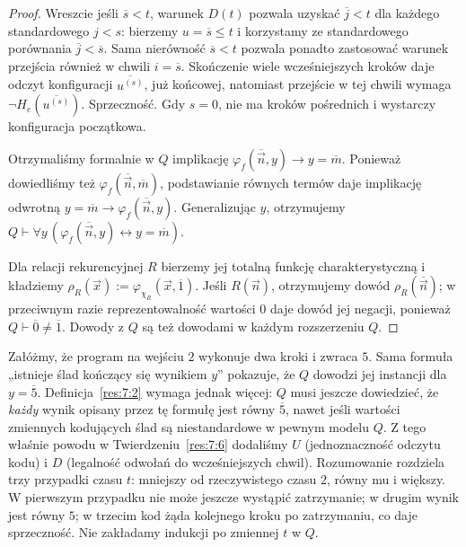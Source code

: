 \begin{proof}
Wreszcie jeśli $\overline s<t$, warunek $D(t)$ pozwala
uzyskać $\overline j<t$ dla każdego standardowego $j<s$:
bierzemy $u=\overline s\le t$ i korzystamy ze standardowego
porównania $\overline j<\overline s$. Sama nierówność
$\overline s<t$ pozwala ponadto zastosować warunek
przejścia również w chwili $i=\overline s$. Skończenie
wiele wcześniejszych kroków daje odczyt konfiguracji
$\overline{u^{(s)}}$, już końcowej, natomiast przejście w tej chwili
wymaga $\neg H_e(\overline{u^{(s)}})$. Sprzeczność. Gdy $s=0$,
nie ma kroków pośrednich i wystarczy konfiguracja początkowa.

Otrzymaliśmy formalnie w $Q$ implikację
$\varphi_f(\overline{\vec n},y)\to y=\overline m$.
Ponieważ dowiedliśmy też $\varphi_f(\overline{\vec n},\overline m)$,
podstawianie równych termów daje implikację odwrotną
$y=\overline m\to\varphi_f(\overline{\vec n},y)$.
Generalizując $y$, otrzymujemy
$Q\vdash\forall y\,(\varphi_f(\overline{\vec n},y)\leftrightarrow y=\overline m)$.

Dla relacji rekurencyjnej $R$ bierzemy jej totalną funkcję
charakterystyczną i kładziemy
$\rho_R(\vec x):=\varphi_{\chi_R}(\vec x,\overline1)$.
Jeśli $R(\vec n)$, otrzymujemy dowód
$\rho_R(\overline{\vec n})$; w przeciwnym razie
reprezentowalność wartości $0$ daje dowód jej negacji,
ponieważ $Q\vdash\overline0\ne\overline1$.
Dowody z $Q$ są też dowodami w każdym rozszerzeniu $Q$.
\end{proof}

\begin{przyklad}
Załóżmy, że program na wejściu $2$ wykonuje dwa kroki i zwraca $5$.
Sama formuła „istnieje ślad kończący się wynikiem $y$” pokazuje,
że $Q$ dowodzi jej instancji dla $y=\overline5$.
Definicja~\ref{res:7:2} wymaga jednak więcej: $Q$ musi jeszcze
dowiedzieć, że \emph{każdy} wynik opisany przez tę formułę
jest równy $\overline5$, nawet jeśli wartości zmiennych kodujących
ślad są niestandardowe w pewnym modelu $Q$.
Z tego właśnie powodu w Twierdzeniu~\ref{res:7:6}
dodaliśmy $U$ (jednoznaczność odczytu kodu) i $D$
(legalność odwołań do wcześniejszych chwil). Rozumowanie
rozdziela trzy przypadki czasu $t$: mniejszy od rzeczywistego
czasu $2$, równy mu i większy. W pierwszym przypadku nie może
jeszcze wystąpić zatrzymanie; w drugim wynik jest równy $5$;
w trzecim kod żąda kolejnego kroku po zatrzymaniu, co daje
sprzeczność. Nie zakładamy indukcji po zmiennej $t$ w $Q$.
\end{przyklad}

